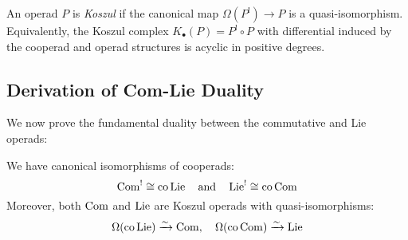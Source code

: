 \begin{definition}
An operad $P$ is \emph{Koszul} if the canonical map $\Omega(P^!) \to P$ is a quasi-isomorphism. Equivalently, the Koszul complex $K_\bullet(P) = P^! \circ P$ with differential induced by the cooperad and operad structures is acyclic in positive degrees.
\end{definition}
 
\subsection{Derivation of Com-Lie Duality}
 
We now prove the fundamental duality between the commutative and Lie operads:
 
\begin{theorem}\label{thm:com-lie}
We have canonical isomorphisms of cooperads:
\[
\operatorname{Com}^! \cong \text{co}\operatorname{Lie} \quad \text{and} \quad \operatorname{Lie}^! \cong \text{co}\operatorname{Com}
\]
Moreover, both $\operatorname{Com}$ and $\operatorname{Lie}$ are Koszul operads with quasi-isomorphisms:
\[
\Omega(\text{co}\operatorname{Lie}) \xrightarrow{\sim} \operatorname{Com}, \quad \Omega(\text{co}\operatorname{Com}) \xrightarrow{\sim} \operatorname{Lie}
\]
\end{theorem}
 
